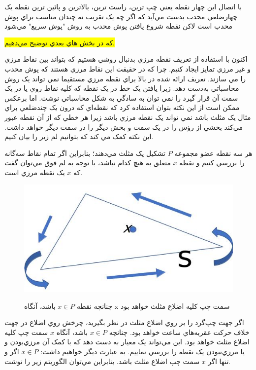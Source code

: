 \documentclass{book}
\begin{document}
با اتصال اين چهار نقطه يعني چپ ترين، راست ترين، بالاترين و پائين ترين نقطه يک چهارضلعي محدب بدست مي‌آيد که اگر چه يک تقريب نه چندان مناسب براي پوش محدب است لاکن نقطه شروع يافتن پوش محدب به روش "پوش سريع" مي‌شود

\colorbox{yellow}{که در بخش هاي بعدي توضيح مي‌دهيم.}

اکنون با استفاده از تعريف نقطه مرزي بدنبال روشي هستيم که بتواند بين نقاط مرزي و غير مرزي تمايز ايجاد کنيم. چرا که در حقيقت اين نقاط مرزي هستند که پوش محدب را مي سازند. تعريف ارائه شده در بالا براي نقطه مرزي مستقيما نمي تواند يک روش محاسباتي به‌دست دهد. زيرا يافتن يک خط در يک نقطه که کليه نقاط روي يا در يک سمت آن قرار گيرد را نمي توان به سادگي به شکل محاسباتي نوشت. اما برعکس ممکن است از اين نکته بتوان استفاده کرد که نقطه‌اي که درون يک چندضلعي براي مثال يک مثلث باشد نمي تواند يک نقطه مرزي باشد زيرا هر خطي که از آن نقطه عبور مي‌کند بخشي از رؤس را در يک سمت و بخش ديگر را در سمت ديگر خواهد داشت. اين نکته کمک مي کند که بتوانيم  لم زير را بيان کنيم.

هر سه نقطه عضو مجموعه $P$ تشکيل يک مثلث مي‌دهند؛ بنابراين اگر تمام نقاط سه‌گانه را بررسي کنيم و نقطه $x$ متعلق به هيچ کدام نباشد، با توجه به لم فوق مي‌توان گفت که $x$ يک نقطه مرزي است.

\begin{figure}[h!]
    \begin{center}
        \includegraphics[width=\linewidth]{left_line.jpg}
        \label{left_line}
        \caption{چنانچه نقطه $x\in P$  باشد، آنگاه x سمت چپ کليه اضلاع مثلث خواهد بود}
    \end{center}
\end{figure}

اگر جهت چپ‌گرد را بر روي اضلاع مثلث در نظر بگيريد، چرخش روي اضلاع در جهت خلاف حرکت عقربه‌هاي ساعت خواهد بود. چنانچه $x\in P$ باشد، آنگاه $x$ سمت چپ کليه اضلاع مثلث خواهد بود. اين مي‌تواند يک معيار به دست دهد که با کمک آن مرزي‌بودن و يا مرزي‌نبودن يک نقطه را بررسي نماييم. به عبارت ديگر خواهيم داشت:  $x\in P$ اگر و تنها اگر $x$ سمت چپ اضلاع مثلث باشد. بنابراين مي‌توان الگوريتم زير را نوشت.
\end{document}
